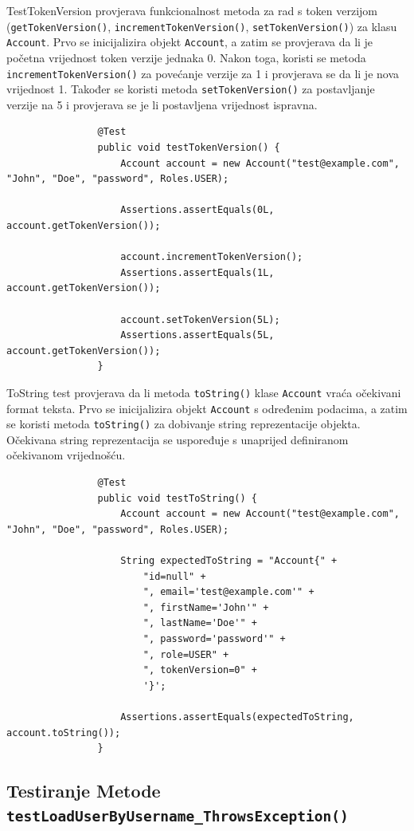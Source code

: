 			TestTokenVersion provjerava funkcionalnost metoda za rad s token verzijom (\texttt{getTokenVersion()}, \texttt{incrementTokenVersion()}, \texttt{setTokenVersion()}) za klasu \texttt{Account}. Prvo se inicijalizira objekt \texttt{Account}, a zatim se provjerava da li je početna vrijednost token verzije jednaka 0. Nakon toga, koristi se metoda \texttt{incrementTokenVersion()} za povećanje verzije za 1 i provjerava se da li je nova vrijednost 1. Također se koristi metoda \texttt{setTokenVersion()} za postavljanje verzije na 5 i provjerava se je li postavljena vrijednost ispravna.
			
			\begin{lstlisting}
				@Test
				public void testTokenVersion() {
					Account account = new Account("test@example.com", "John", "Doe", "password", Roles.USER);
					
					Assertions.assertEquals(0L, account.getTokenVersion());
					
					account.incrementTokenVersion();
					Assertions.assertEquals(1L, account.getTokenVersion());
					
					account.setTokenVersion(5L);
					Assertions.assertEquals(5L, account.getTokenVersion());
				}
			\end{lstlisting}
			
			
			ToString test provjerava da li metoda \texttt{toString()} klase \texttt{Account} vraća očekivani format teksta. Prvo se inicijalizira objekt \texttt{Account} s određenim podacima, a zatim se koristi metoda \texttt{toString()} za dobivanje string reprezentacije objekta. Očekivana string reprezentacija se uspoređuje s unaprijed definiranom očekivanom vrijednošću.
			
			\begin{lstlisting}
				@Test
				public void testToString() {
					Account account = new Account("test@example.com", "John", "Doe", "password", Roles.USER);
					
					String expectedToString = "Account{" +
						"id=null" +
						", email='test@example.com'" +
						", firstName='John'" +
						", lastName='Doe'" +
						", password='password'" +
						", role=USER" +
						", tokenVersion=0" +
						'}';
					
					Assertions.assertEquals(expectedToString, account.toString());
				}
			\end{lstlisting}
			
			\subsection{Testiranje Metode \texttt{testLoadUserByUsername_ThrowsException()}}
			
